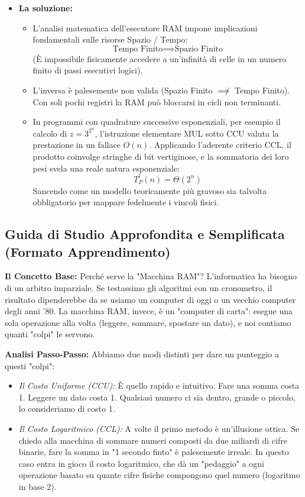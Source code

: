 \documentclass[a4paper, 11pt]{report}
\begin{document}
\begin{itemize}
\item \textbf{La soluzione:}
\begin{itemize}
    \item L'analisi matematica dell'esecutore RAM impone implicazioni fondamentali sulle risorse Spazio / Tempo:
    \begin{equation*}
    \text{Tempo Finito} \implies \text{Spazio Finito}
    \end{equation*}
    (È impossibile fisicamente accedere a un'infinità di celle in un numero finito di passi esecutivi logici).
    \item L'inversa è palesemente non valida (Spazio Finito $\not\implies$ Tempo Finito). Con soli pochi registri la RAM può bloccarsi in cicli non terminanti.
    \item In programmi con quadrature successive esponenziali, per esempio il calcolo di $z = 3^{2^n}$, l'istruzione elementare MUL sotto CCU valuta la prestazione in un fallace $O(n)$. Applicando l'aderente criterio CCL, il prodotto coinvolge stringhe di bit vertiginose, e la sommatoria dei loro pesi svela una reale natura esponenziale:
    \[ T^l_P(n) = \Theta(2^n) \]
    Sancendo come un modello teoricamente più gravoso sia talvolta obbligatorio per mappare fedelmente i vincoli fisici.
\end{itemize}
\end{itemize}

\vspace{0.5cm}
\subsection*{Guida di Studio Approfondita e Semplificata (Formato Apprendimento)}


\textbf{Il Concetto Base:}
Perché serve la "Macchina RAM"? L'informatica ha bisogno di un arbitro imparziale. Se testassimo gli algoritmi con un cronometro, il risultato dipenderebbe da se usiamo un computer di oggi o un vecchio computer degli anni '80. La macchina RAM, invece, è un "computer di carta": esegue una sola operazione alla volta (leggere, sommare, spostare un dato), e noi contiamo quanti "colpi" le servono.

\textbf{Analisi Passo-Passo:}
Abbiamo due modi distinti per dare un punteggio a questi "colpi":
\begin{itemize}
\item \textit{Il Costo Uniforme (CCU):} È quello rapido e intuitivo. Fare una somma costa 1. Leggere un dato costa 1. Qualsiasi numero ci sia dentro, grande o piccolo, lo consideriamo di costo 1.
\item \textit{Il Costo Logaritmico (CCL):} A volte il primo metodo è un'illusione ottica. Se chiedo alla macchina di sommare numeri composti da due miliardi di cifre binarie, fare la somma in "1 secondo finto" è palesemente irreale. In questo caso entra in gioco il costo logaritmico, che dà un "pedaggio" a ogni operazione basato su quante cifre fisiche compongono quel numero (logaritmo in base 2).
\end{itemize}
\end{document}
